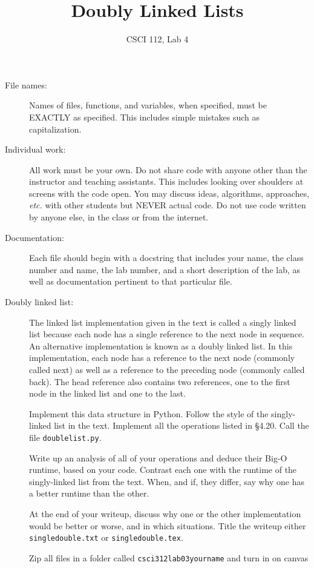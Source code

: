 \documentclass{article}
\title{Doubly Linked Lists}
\author{CSCI 112, Lab 4}
\date{}
\begin{document}
\sloppy

\maketitle

\begin{description} 
\item[File names:]  Names of files, functions, and variables, 
when specified,
must be EXACTLY as specified.  This includes simple mistakes such
as capitalization.

\item[Individual work:]  All work must be your own.  Do not share
code with anyone other than the instructor and teaching assistants.
This includes looking over shoulders at screens with the code open.
You may discuss ideas, algorithms, approaches, {\em etc.} with
other students but NEVER actual code.  Do not use code
written by anyone else, in the class or from the internet.

\item[Documentation:] Each file should begin with a docstring
that includes your name, the class number and name, the lab
number, and  
a short description of the lab, as well as documentation pertinent
to that particular file.

\item[Doubly linked list:] 
The linked list implementation given in the text is called a singly linked list 
because each node has a single reference to the next node in sequence. 
An alternative implementation is known as a doubly linked list. 
In this implementation, each node has a reference to the next node 
(commonly called next) as well as a reference to the preceding node 
(commonly called back). The head reference also contains two references,
 one to the first node in the linked list and one to the last.
 
 Implement this data structure in Python.  Follow the style of the
 singly-linked list in the text.  Implement all the operations 
listed in \S 4.20.  Call the file \lstinline{doublelist.py}.

Write up an analysis of all of your operations and deduce their
Big-O runtime, based on your code.  Contrast each one with
the runtime of the singly-linked list from the text.  When, and if,
they differ, say why one has a better runtime than the other.

At the end of your writeup, discuss why one or the other 
implementation would be better or worse, and in which situations.
Title the writeup either {\tt singledouble.txt} or {\tt singledouble.tex}.

Zip all files in a folder called {\tt csci312lab03yourname} and turn in on canvas

\end{description}
\end{document}
